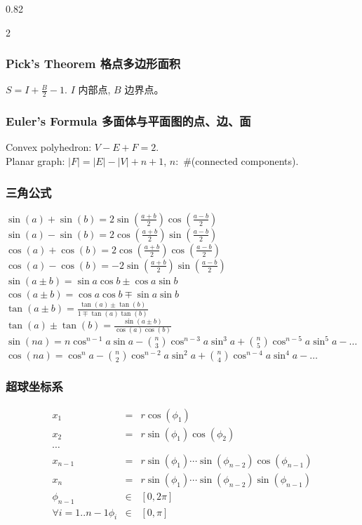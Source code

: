 \begin{small}
\begin{spacing}{0.82}
\begin{multicols*}{2}
\subsubsection*{Pick's Theorem 格点多边形面积}
$S=I+\frac{B}{2}-1.$ $I$ 内部点, $B$ 边界点。
\subsubsection*{Euler's Formula 多面体与平面图的点、边、面}
Convex polyhedron: $V-E+F=2$. \\
Planar graph: $|F|=|E|-|V|+n+1$, $n:$ \#(connected components).
\end{multicols*}
\subsubsection*{三角公式}
\noindent
$
\sin(a) + \sin(b) = 2\sin(\frac{a + b}{2})\cos(\frac{a - b}{2})
$ \\
$
\sin(a) - \sin(b) = 2\cos(\frac{a + b}{2})\sin(\frac{a - b}{2})
$ \\
$
\cos(a) + \cos(b) = 2\cos(\frac{a + b}{2})\cos(\frac{a - b}{2})
$ \\
$
\cos(a) - \cos(b) = -2\sin(\frac{a + b}{2})\sin(\frac{a - b}{2})
$ \\
$
\sin(a \pm b) = \sin a \cos b \pm \cos a \sin b
$ \\
$
\cos(a \pm b) = \cos a \cos b \mp \sin a \sin b
$ \\
$
\tan(a \pm b) = \frac{\tan(a)\pm\tan(b)}{1 \mp \tan(a)\tan(b)}
$ \\
$
\tan(a) \pm \tan(b) = \frac{\sin(a \pm b)}{\cos(a)\cos(b)}
$ \\
$
\sin(na) = n\cos^{n-1}a\sin a - \binom{n}{3}\cos^{n-3}a \sin^3a + \binom{n}{5}\cos^{n-5}a\sin^5a - \dots
$\\
$
\cos(na) = \cos^{n}a - \binom{n}{2}\cos^{n-2}a \sin^2a + \binom{n}{4}\cos^{n-4}a\sin^4a - \dots
$
\subsubsection{超球坐标系}
\begin{eqnarray*}
 	x_1 &=& r\cos(\phi_1) \\ 
	x_2 &=& r\sin(\phi_1)\cos(\phi_2) \\
	\cdots\\
	x_{n-1} &=& r\sin(\phi_1)\cdots\sin(\phi_{n-2})\cos(\phi_{n-1}) \\
	x_n &=& r\sin(\phi_1)\cdots\sin(\phi_{n-2})\sin(\phi_{n-1}) \\
	\phi_{n-1} &\in& [0,2\pi]\\
	\forall {i=1..{n-1}}\phi_i &\in& [0,\pi]\\
\end{eqnarray*}

\end{spacing}
\end{small}
